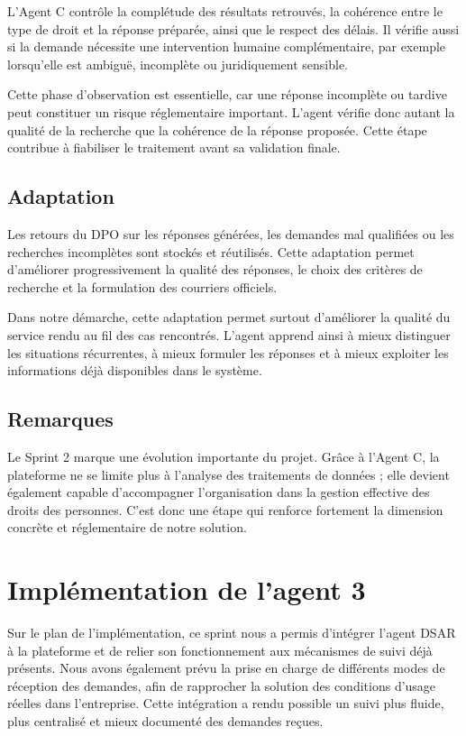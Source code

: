 \documentclass[12pt,a4paper]{report}
\begin{document}
L'Agent C contrôle la complétude des résultats retrouvés, la cohérence entre le type de droit et la réponse préparée, ainsi que le respect des délais. Il vérifie aussi si la demande nécessite une intervention humaine complémentaire, par exemple lorsqu'elle est ambiguë, incomplète ou juridiquement sensible.

Cette phase d'observation est essentielle, car une réponse incomplète ou tardive peut constituer un risque réglementaire important. L'agent vérifie donc autant la qualité de la recherche que la cohérence de la réponse proposée. Cette étape contribue à fiabiliser le traitement avant sa validation finale.

\subsection{Adaptation}

Les retours du DPO sur les réponses générées, les demandes mal qualifiées ou les recherches incomplètes sont stockés et réutilisés. Cette adaptation permet d'améliorer progressivement la qualité des réponses, le choix des critères de recherche et la formulation des courriers officiels.

Dans notre démarche, cette adaptation permet surtout d'améliorer la qualité du service rendu au fil des cas rencontrés. L'agent apprend ainsi à mieux distinguer les situations récurrentes, à mieux formuler les réponses et à mieux exploiter les informations déjà disponibles dans le système.

\subsection{Remarques}

Le Sprint 2 marque une évolution importante du projet. Grâce à l'Agent C, la plateforme ne se limite plus à l'analyse des traitements de données ; elle devient également capable d'accompagner l'organisation dans la gestion effective des droits des personnes. C'est donc une étape qui renforce fortement la dimension concrète et réglementaire de notre solution.

\section{Implémentation de l'agent 3}

Sur le plan de l'implémentation, ce sprint nous a permis d'intégrer l'agent DSAR à la plateforme et de relier son fonctionnement aux mécanismes de suivi déjà présents. Nous avons également prévu la prise en charge de différents modes de réception des demandes, afin de rapprocher la solution des conditions d'usage réelles dans l'entreprise. Cette intégration a rendu possible un suivi plus fluide, plus centralisé et mieux documenté des demandes reçues.
\end{document}
